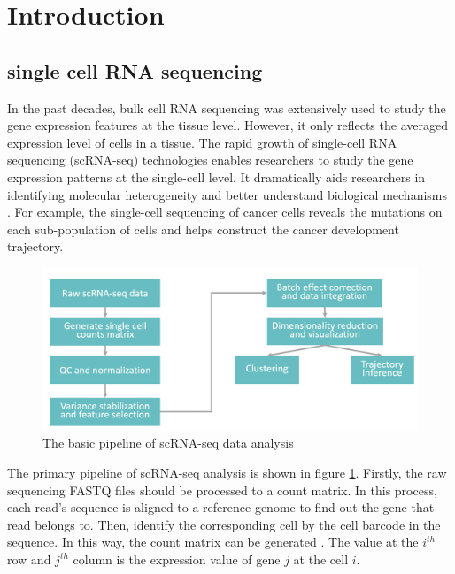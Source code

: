 \section{Introduction}

\subsection{single cell RNA sequencing}

In the past decades, bulk cell RNA sequencing was extensively used to study the gene expression features at the tissue level. However, it only reflects the averaged expression level of cells in a tissue. The rapid growth of single-cell RNA sequencing (scRNA-seq) technologies enables researchers to study the gene expression patterns at the single-cell level. It dramatically aids researchers in identifying molecular heterogeneity and better understand biological mechanisms \cite{shapiro2013single}. For example, the single-cell sequencing of cancer cells reveals the mutations on each sub-population of cells and helps construct the cancer development trajectory. 

\begin{figure}[htb!]
    \centering
    \includegraphics[width=1\textwidth]{figures/myfigures/scpip.png}
    \caption{The basic pipeline of scRNA-seq data analysis}
    \label{scpip}
\end{figure}

The primary pipeline of scRNA-seq analysis is shown in figure \ref{scpip}. Firstly, the raw sequencing FASTQ files should be processed to a count matrix. In this process, each read's sequence is aligned to a reference genome to find out the gene that read belongs to. Then, identify the corresponding cell by the cell barcode in the sequence. In this way, the count matrix can be generated \cite{petukhov2017accurate}. The value at the $i^{th}$ row and $j^{th}$ column is the expression value of gene $j$ at the cell $i$.

